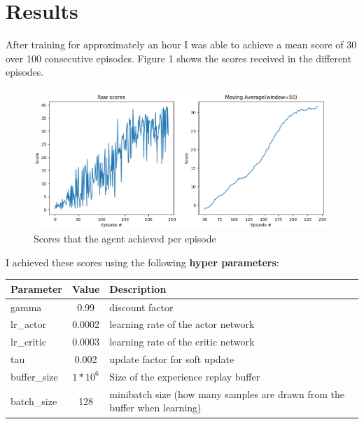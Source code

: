 \documentclass[12pt,a4paper]{article}
\begin{document}
    \section{Results}\label{sec:results}
    After training for approximately an hour I was able to achieve a mean score of 30 over 100 consecutive episodes.
    Figure 1 shows the scores received in the different episodes.

    \begin{figure}[H]
        \includegraphics[width=\linewidth]{img/scores}
        \caption{Scores that the agent achieved per episode}
        \label{fig:scores}
    \end{figure}

    I achieved these scores using the following \textbf{hyper parameters}:
    \begin{center}
        \begin{tabular}{||l c l||}
            \hline
            Parameter    & Value      & Description \\ [0.5ex]
            \hline\hline
            gamma        & 0.99       & discount factor                                                           \\
            \hline
            lr\_actor    & 0.0002     & learning rate of the actor network                                        \\
            \hline
            lr\_critic   & 0.0003     & learning rate of the critic network                                       \\
            \hline
            tau          & 0.002      & update factor for soft update                                             \\
            \hline
            buffer\_size & $1*10^{6}$ & Size of the experience replay buffer                                      \\
            \hline
            batch\_size  & 128        & minibatch size (how many samples are drawn from the buffer when learning) \\
            \hline
        \end{tabular}
    \end{center}
\end{document}
